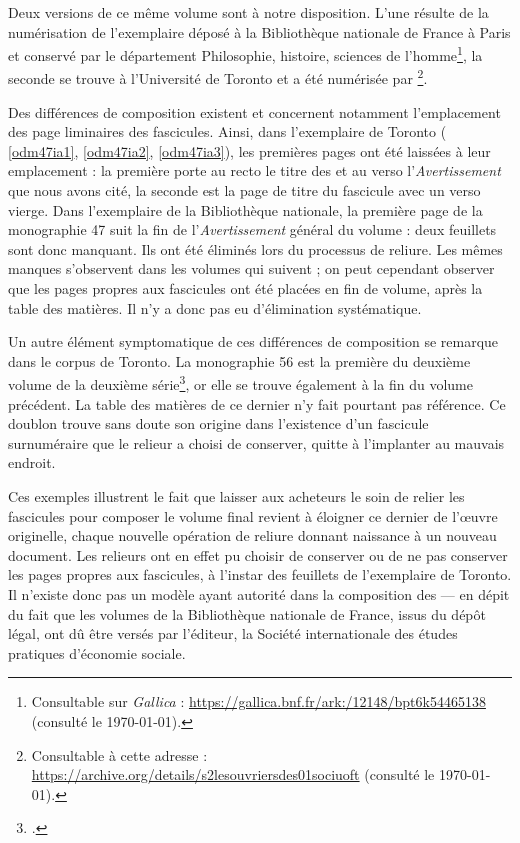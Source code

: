 Deux versions de ce même volume sont à notre disposition. L'une résulte de la numérisation de l'exemplaire déposé à la Bibliothèque nationale de France à Paris et conservé par le département Philosophie, histoire, sciences de l'homme\footnote{Consultable sur \textit{Gallica} : \url{https://gallica.bnf.fr/ark:/12148/bpt6k54465138} (consulté le \today).}, la seconde se trouve à l'Université de Toronto et a été numérisée par \ia\footnote{Consultable à cette adresse : \url{https://archive.org/details/s2lesouvriersdes01sociuoft} (consulté le \today).}.

Des différences de composition existent et concernent notamment l'emplacement des page liminaires des fascicules. Ainsi, dans l'exemplaire de Toronto (\fig{} \ref{odm47ia1}, \ref{odm47ia2}, \ref{odm47ia3}), les premières pages ont été laissées à leur emplacement : la première porte au recto le titre des \odm{} et au verso l'\textit{Avertissement} que nous avons cité, la seconde est la page de titre du fascicule avec un verso vierge. Dans l'exemplaire de la Bibliothèque nationale, la première page de la monographie \no{} 47 suit la fin de l'\textit{Avertissement} général du volume : deux feuillets sont donc manquant. Ils ont été éliminés lors du processus de reliure. Les mêmes manques s'observent dans les volumes qui suivent ; on peut cependant observer que les pages propres aux fascicules ont été placées en fin de volume, après la table des matières. Il n'y a donc pas eu d'élimination systématique.

Un autre élément symptomatique de ces différences de composition se remarque dans le corpus de Toronto. La monographie \no{} 56 est la première du deuxième volume de la deuxième série\footcite{mono056a}, or elle se trouve également à la fin du volume précédent. La table des matières de ce dernier n'y fait pourtant pas référence. Ce doublon trouve sans doute son origine dans l'existence d'un fascicule surnuméraire que le relieur a choisi de conserver, quitte à l'implanter au mauvais endroit.

Ces exemples illustrent le fait que laisser aux acheteurs le soin de relier les fascicules pour composer le volume final revient à éloigner ce dernier de l'\oe{}uvre originelle, chaque nouvelle opération de reliure donnant naissance à un nouveau document. Les relieurs ont en effet pu choisir de conserver ou de ne pas conserver les pages propres aux fascicules, à l'instar des feuillets de l'exemplaire de Toronto. Il n'existe donc pas un modèle ayant autorité dans la composition des \odm{} --- en dépit du fait que les volumes de la Bibliothèque nationale de France, issus du dépôt légal, ont dû être versés par l'éditeur, \cad{} la Société internationale des études pratiques d'économie sociale.

